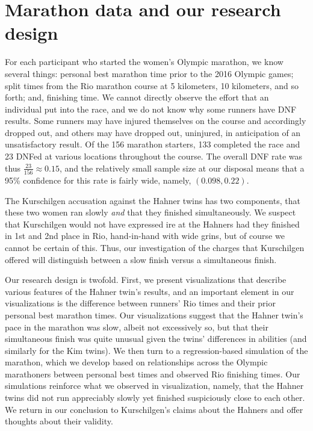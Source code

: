 \documentclass[12pt,titlepage]{article}
\begin{document}
\section*{Marathon data and our research design}

For each participant who started the women's Olympic marathon, we know
several things: personal best marathon time prior to the 2016 Olympic
games; split times from the Rio marathon course at 5 kilometers, 10
kilometers, and so forth; and, finishing time. We cannot directly
observe the effort that an individual put into the race, and we do not
know why some runners have DNF results.  Some runners may have injured
themselves on the course and accordingly dropped out, and others may
have dropped out, uninjured, in anticipation of an unsatisfactory
result. Of the 156 marathon starters, 133 completed the race and 23
DNFed at various locations throughout the course. The overall DNF rate
was thus $\frac{23}{156} \approx 0.15$, and the relatively small
sample size at our disposal means that a 95\% confidence for this rate
is fairly wide, namely, $\left(0.098, 0.22\right)$. 

The Kurschilgen accusation against the Hahner twins has two
components, that these two women ran slowly \emph{and} that they
finished simultaneously.  We suspect that Kurschilgen would not have
expressed ire at the Hahners had they finished in 1st and 2nd place in
Rio, hand-in-hand with wide grins, but of course we cannot be certain
of this.  Thus, our investigation of the charges that Kurschilgen
offered will distinguish between a slow finish versus a simultaneous
finish.

Our research design is twofold.  First, we present visualizations that
describe various features of the Hahner twin's results, and an
important element in our visualizations is the difference between
runners' Rio times and their prior personal best marathon times.  Our
visualizations suggest that the Hahner twin's pace in the marathon was
slow, albeit not excessively so, but that their simultaneous finish
was quite unusual given the twins' differences in abilities (and
similarly for the Kim twins).  We then turn to a regression-based
simulation of the marathon, which we develop based on relationships
across the Olympic marathoners between personal best times and
observed Rio finishing times.  Our simulations reinforce what we
observed in visualization, namely, that the Hahner twins did not run
appreciably slowly yet finished suspiciously close to each other.  We
return in our conclusion to Kurschilgen's claims about the Hahners and
offer thoughts about their validity.
\end{document}
